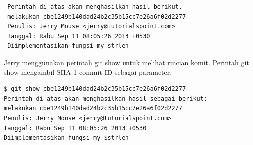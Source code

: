 \begin{verbatim}
 Perintah di atas akan menghasilkan hasil berikut.
 melakukan cbe1249b140dad24b2c35b15cc7e26a6f02d2277 
 Penulis: Jerry Mouse <jerry@tutorialspoint.com>
 Tanggal: Rabu Sep 11 08:05:26 2013 +0530 
 Diimplementasikan fungsi my_strlen
 \end{verbatim}
 
 \vspace{\baselineskip}
\noindent 
Jerry menggunakan perintah git show untuk melihat rincian komit. Perintah git show mengambil SHA-1 commit ID sebagai parameter. \par
\vspace{\baselineskip}
\noindent 
\begin{verbatim}
$ git show cbe1249b140dad24b2c35b15cc7e26a6f02d2277 
Perintah di atas akan menghasilkan hasil sebagai berikut: 
melakukan cbe1249b140dad24b2c35b15cc7e26a6f02d2277 
Penulis: Jerry Mouse <jerry@tutorialspoint.com> 
Tanggal: Rabu Sep 11 08:05:26 2013 +0530 
Diimplementasikan fungsi my_$strlen 
 \end{verbatim}
 
